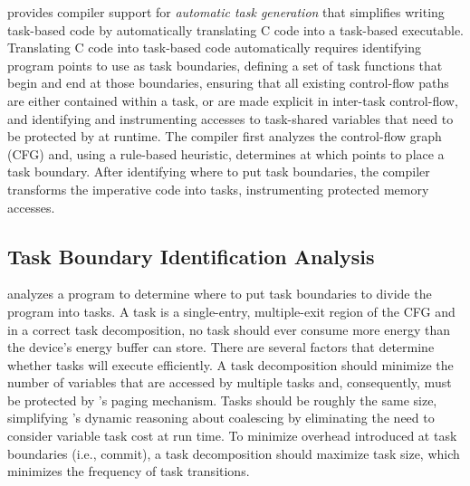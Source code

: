 \sys provides compiler support for \emph{automatic task generation} that simplifies writing task-based code by automatically translating C code into a task-based executable.  Translating C code into task-based code automatically requires identifying program points to use as task boundaries, defining a set of task functions that begin and end at those boundaries, ensuring that all existing control-flow paths are either contained within a task, or are made explicit in inter-task control-flow, and identifying and instrumenting accesses to task-shared variables that need to be protected by \sys at runtime.  The \sys compiler first analyzes the control-flow graph (CFG) and, using a rule-based heuristic, determines at which points to place a task boundary.  After identifying where to put task boundaries, the \sys compiler transforms the imperative code into tasks, instrumenting protected memory accesses. 

%
%

\subsection{Task Boundary Identification Analysis}
\label{sec:compiler_analysis_pass}


\sys analyzes a program to determine where to put task boundaries to divide the
program into tasks. A task is a single-entry, multiple-exit region of the CFG
and in a correct task decomposition, no task should ever consume more energy
than the device's energy buffer can store.  There are several factors that
determine whether tasks will execute efficiently. A task decomposition should
minimize the number of variables that are accessed by multiple tasks and, 
consequently, must be protected by \sys's paging mechanism.  Tasks should
be roughly the same size, simplifying \sys's dynamic reasoning about coalescing
by eliminating the need to consider variable task cost at run time.  To minimize
overhead introduced at task boundaries (i.e., commit), a task decomposition should 
maximize task size, which minimizes the frequency of task transitions.


